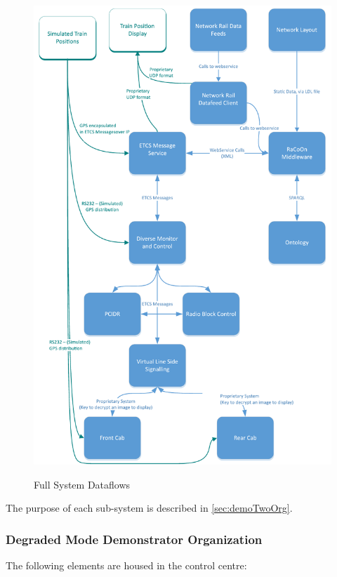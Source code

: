 \begin{figure}[H]
\myfloatalign
{\includegraphics[max height=\textheight,max width=\linewidth]{gfx/FullSystem}} 
\caption{Full System Dataflows}
\label{fig:fullsys}
\end{figure}

The purpose of each sub-system is described in \autoref{sec:demoTwoOrg}. 

\subsubsection{Degraded Mode Demonstrator Organization}
\label{sec:demoTwoOrg}
The following elements are housed in the control centre:


